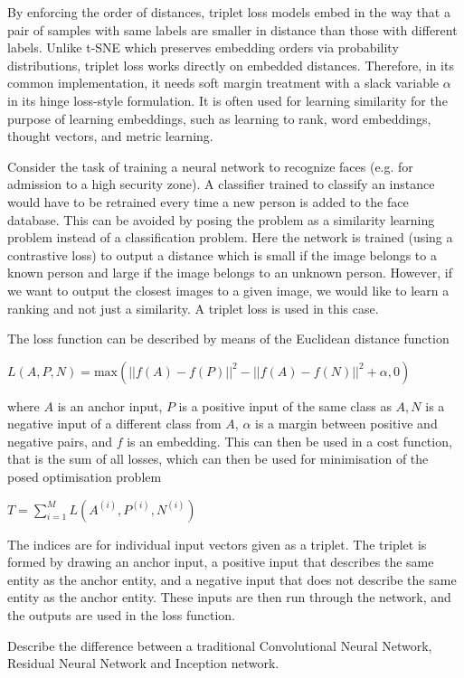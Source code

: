 By enforcing the order of distances, triplet loss models embed in the way that a pair of samples with same labels are smaller in distance than those with different labels. Unlike t-SNE which preserves embedding orders via probability distributions, triplet loss works directly on embedded distances. Therefore, in its common implementation, it needs soft margin treatment with a slack variable $\alpha$ in its hinge loss-style formulation. It is often used for learning similarity for the purpose of learning embeddings, such as learning to rank, word embeddings, thought vectors, and metric learning.

Consider the task of training a neural network to recognize faces (e.g. for admission to a high security zone). A classifier trained to classify an instance would have to be retrained every time a new person is added to the face database. This can be avoided by posing the problem as a similarity learning problem instead of a classification problem. Here the network is trained (using a contrastive loss) to output a distance which is small if the image belongs to a known person and large if the image belongs to an unknown person. However, if we want to output the closest images to a given image, we would like to learn a ranking and not just a similarity. A triplet loss is used in this case.

The loss function can be described by means of the Euclidean distance function

$L (A,P,N) = \text{max} (|| f(A)-f(P) ||^2 - || f(A)-f(N) ||^2 + \alpha,0)$

where $A$ is an anchor input, $P$ is a positive input of the same class as $A, N$ is a negative input of a different class from $A$, $\alpha$ is a margin between positive and negative pairs, and $f$ is an embedding.
This can then be used in a cost function, that is the sum of all losses, which can then be used for minimisation of the posed optimisation problem

$T = \sum_{i=1}^M L ( A^{(i)} , P^{(i)}, N^{(i)} )$

The indices are for individual input vectors given as a triplet. The triplet is formed by drawing an anchor input, a positive input that describes the same entity as the anchor entity, and a negative input that does not describe the same entity as the anchor entity. These inputs are then run through the network, and the outputs are used in the loss function.

Describe the difference between a traditional Convolutional Neural Network, Residual Neural Network and Inception network.

